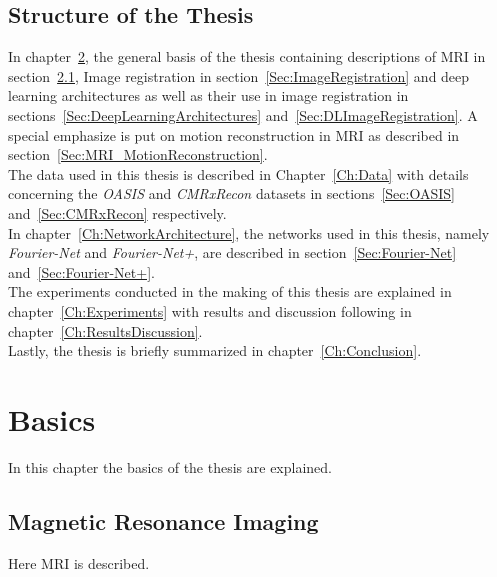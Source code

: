 \documentclass[english,version-2022-01]{uzl-thesis} %
\begin{document}
\section{Structure of the Thesis} \label{Sec:Structure}
In chapter~\ref{Ch:Basics}, the general basis of the thesis containing descriptions of MRI in section~\ref{Sec:MRI}, Image registration in section~\ref{Sec:ImageRegistration} and deep learning architectures as well as their use in image registration in sections~\ref{Sec:DeepLearningArchitectures} and~\ref{Sec:DLImageRegistration}. A special emphasize is put on motion reconstruction in MRI as described in section~\ref{Sec:MRI_MotionReconstruction}.\\
The data used in this thesis is described in Chapter~\ref{Ch:Data} with details concerning the \emph{OASIS} and \emph{CMRxRecon} datasets in sections~\ref{Sec:OASIS} and~\ref{Sec:CMRxRecon} respectively.\\
In chapter~\ref{Ch:NetworkArchitecture}, the networks used in this thesis, namely \emph{Fourier-Net} and \emph{Fourier-Net+}, are described in section~\ref{Sec:Fourier-Net} and~\ref{Sec:Fourier-Net+}.\\
The experiments conducted in the making of this thesis are explained in chapter~\ref{Ch:Experiments} with results and discussion following in chapter~\ref{Ch:ResultsDiscussion}.\\
Lastly, the thesis is briefly summarized in chapter~\ref{Ch:Conclusion}.


\chapter{Basics}	\label{Ch:Basics}
In this chapter the basics of the thesis are explained.

\section{Magnetic Resonance Imaging} \label{Sec:MRI}
Here MRI is described. %
\end{document}
